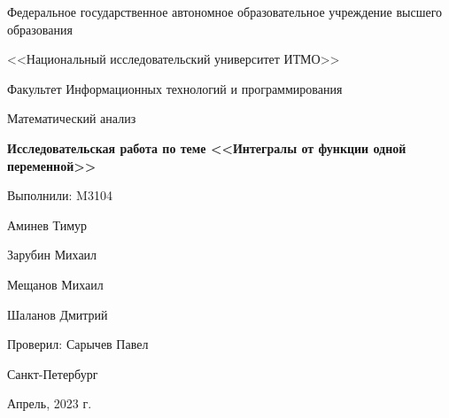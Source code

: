 \begin{titlepage}
  \begin{center}
    \Large
    Федеральное государственное автономное образовательное учреждение
    высшего образования

    <<Национальный исследовательский университет ИТМО>>

    \vspace{1cm}

    \Large
    Факультет Информационных технологий и программирования

    \vspace{1cm}
    Математический анализ

    \vspace{0.5cm}
    \LARGE
    \textbf{Исследовательская работа по теме
      <<Интегралы от функции одной переменной>>
    }
  \end{center}

  \vspace{4cm}
  \vfill

  \begin{flushright}
    \Large
    Выполнили: M3104

    Аминев Тимур

    Зарубин Михаил

    Мещанов Михаил

    Шаланов Дмитрий


    Проверил: Сарычев Павел
  \end{flushright}

  \vfill

  \begin{center}
    \Large
    Санкт-Петербург

    Апрель, 2023 г.
  \end{center}
\end{titlepage}
